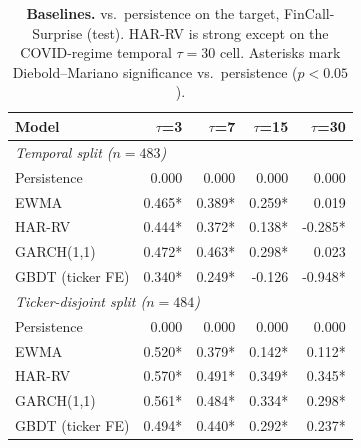 \begin{table}[t]
\centering
\small
\setlength{\tabcolsep}{4pt}
\begin{tabular}{lrrrr}
\toprule
Model & $\tau$=3 & $\tau$=7 & $\tau$=15 & $\tau$=30 \\
\midrule
\multicolumn{5}{l}{\textit{Temporal split ($n{=}483$)}}\\
Persistence       & 0.000 & 0.000 & 0.000 & 0.000 \\
EWMA              & 0.465* & 0.389* & 0.259* & 0.019 \\
HAR-RV            & 0.444* & 0.372* & 0.138* & -0.285* \\
GARCH(1,1)        & 0.472* & 0.463* & 0.298* & 0.023 \\
GBDT (ticker FE)  & 0.340* & 0.249* & -0.126 & -0.948* \\
\midrule
\multicolumn{5}{l}{\textit{Ticker-disjoint split ($n{=}484$)}}\\
Persistence       & 0.000 & 0.000 & 0.000 & 0.000 \\
EWMA              & 0.520* & 0.379* & 0.142* & 0.112* \\
HAR-RV            & 0.570* & 0.491* & 0.349* & 0.345* \\
GARCH(1,1)        & 0.561* & 0.484* & 0.334* & 0.298* \\
GBDT (ticker FE)  & 0.494* & 0.440* & 0.292* & 0.237* \\
\bottomrule
\end{tabular}
\caption{\textbf{Baselines.} \Rtwo{} vs.\ persistence on the \dv{} target,
FinCall-Surprise (test). HAR-RV is strong except on the COVID-regime temporal
$\tau{=}30$ cell. Asterisks mark Diebold--Mariano significance vs.\ persistence
($p<0.05$).}
\label{tab:baselines}
\end{table}
